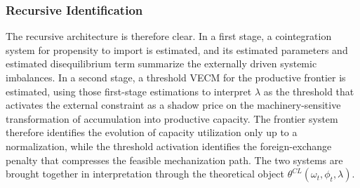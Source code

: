 \subsubsection{Recursive Identification}
\label{subsec:chile_recursive}

The recursive architecture is therefore clear. In a first stage, a
cointegration system for propensity to import is estimated, and its
estimated parameters and estimated disequilibrium term summarize the
externally driven systemic imbalances. In a second stage, a threshold
VECM for the productive frontier is estimated, using those first-stage
estimations to interpret $\lambda$ as the threshold that activates the
external constraint as a shadow price on the machinery-sensitive
transformation of accumulation into productive capacity. The frontier
system therefore identifies the evolution of capacity utilization only
up to a normalization, while the threshold activation identifies the
foreign-exchange penalty that compresses the feasible mechanization
path. The two systems are brought together in interpretation through the
theoretical object $\theta^{CL}(\omega_t,\phi_t,\lambda)$.

